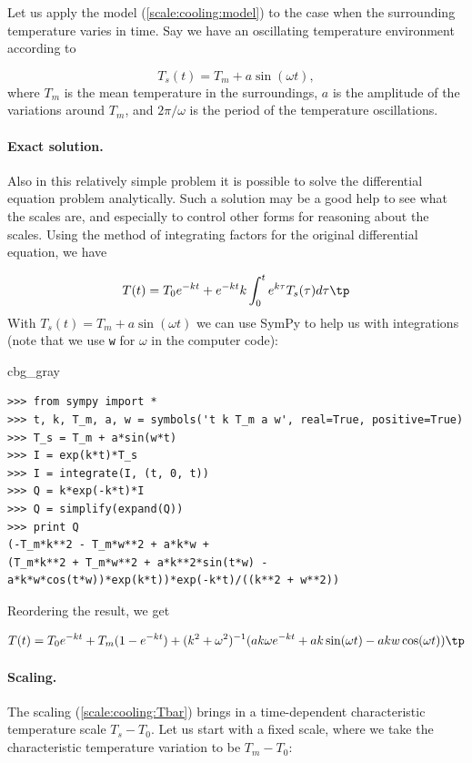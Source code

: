 \documentclass[graybox,envcountchap,sectrefs,final]{svmonodo}
\newenvironment{_cod_tight}[1]{
   \def\FrameCommand{\colorbox{#1}}
   \FrameRule0.6pt\MakeFramed {\FrameRestore}\vskip3mm}
   {\vskip0mm\endMakeFramed}
\newenvironment{cod}[1]{
\bgroup\rmfamily
\fboxsep=0mm\relax
\begin{_cod_tight}{#1}
\list{}{\parsep=-2mm\parskip=0mm\topsep=0pt\leftmargin=2mm
\rightmargin=2\leftmargin\leftmargin=4pt\relax}
\item\relax}
{\endlist\end{_cod_tight}\egroup}
\begin{document}
Let us apply the model (\ref{scale:cooling:model}) to the case when
the surrounding temperature varies in time. Say we have
an oscillating temperature environment according to

\begin{equation}
T_s(t) = T_m + a\sin(\omega t),
\label{scale:cooling:Tst}
\end{equation}
where $T_m$ is the mean temperature in the surroundings, $a$ is
the amplitude of the variations around $T_m$, and $2\pi/\omega$ is
the period of the temperature oscillations.

\paragraph{Exact solution.}
Also in this relatively simple problem
it is possible to solve the differential equation problem analytically.
Such a solution may be a good help to see what the scales are, and
especially to control other forms for reasoning about the scales.
Using the method of integrating factors for the
original differential equation, we have

\[ T(t) = T_0e^{-kt} + e^{-kt}k\int_0^t e^{k\tau}T_s(\tau)d\tau\tp\]
With $T_s(t)=T_m + a\sin (\omega t)$ we can use SymPy to help us with
integrations (note that we use \texttt{w} for $\omega$ in the computer code):

\begin{cod}{cbg_gray}\begin{Verbatim}[numbers=none,fontsize=\fontsize{9pt}{9pt},baselinestretch=0.95,xleftmargin=2mm]
>>> from sympy import *
>>> t, k, T_m, a, w = symbols('t k T_m a w', real=True, positive=True)
>>> T_s = T_m + a*sin(w*t)
>>> I = exp(k*t)*T_s
>>> I = integrate(I, (t, 0, t))
>>> Q = k*exp(-k*t)*I
>>> Q = simplify(expand(Q))
>>> print Q
(-T_m*k**2 - T_m*w**2 + a*k*w +
(T_m*k**2 + T_m*w**2 + a*k**2*sin(t*w) -
a*k*w*cos(t*w))*exp(k*t))*exp(-k*t)/((k**2 + w**2))
\end{Verbatim}
\end{cod}
\noindent
Reordering the result, we get

\[ T(t) = T_0e^{-kt} + T_m(1- e^{-kt}) +  (k^2 + \omega^2)^{-1}(ak\omega e^{-kt}
+ ak\sin (\omega t) - akw\cos(\omega t))\tp\]


\paragraph{Scaling.}
The scaling (\ref{scale:cooling:Tbar}) brings in a time-dependent
characteristic temperature scale $T_s-T_0$. Let us start with a
fixed scale, where we take the characteristic temperature variation to
be $T_m - T_0$:
\end{document}
